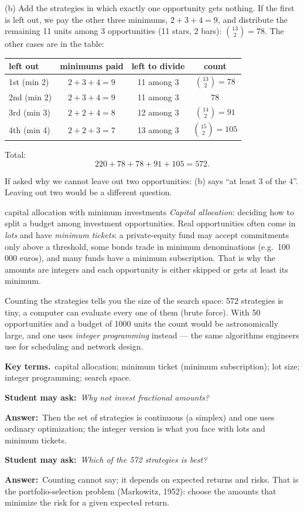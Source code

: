 \documentclass[11pt,a4paper,parskip=half]{scrartcl}
\newcommand{\terms}{\par\textbf{\color{plum}Key terms.}\ }
\newcommand{\sq}[1]{\par\textbf{\color{plum}Student may ask:}\ \emph{#1}\par}
\newcommand{\ans}{\textbf{Answer:}\ }
\begin{document}
(b) Add the strategies in which exactly one opportunity gets nothing. If the
first is left out, we pay the other three minimums, $2+3+4 = 9$, and
distribute the remaining 11 units among 3 opportunities (11 stars, 2 bars):
$\binom{13}{2} = 78$. The other cases are in the table:

\begin{center}
	\begin{tabular}{lccc}\toprule
		left out    & minimums paid & left to divide & count                 \\\midrule
		1st (min 2) & $2+3+4=9$     & 11 among 3     & $\binom{13}{2} = 78$  \\
		2nd (min 2) & $2+3+4=9$     & 11 among 3     & $78$                  \\
		3rd (min 3) & $2+2+4=8$     & 12 among 3     & $\binom{14}{2} = 91$  \\
		4th (min 4) & $2+2+3=7$     & 13 among 3     & $\binom{15}{2} = 105$ \\\bottomrule
	\end{tabular}
\end{center}

Total:
\[ 220+78+78+91+105 = 572. \]

\begin{cue}
	If asked why we cannot leave out two opportunities: (b) says ``at least
	3 of the 4''. Leaving out two would be a different question.
\end{cue}

\begin{bg}{capital allocation with minimum investments}
	\emph{Capital allocation}: deciding how to split a budget among
	investment opportunities. Real opportunities often come in \emph{lots} and
	have \emph{minimum tickets}: a private-equity fund may accept commitments
	only above a threshold, some bonds trade in minimum denominations (e.g.\
	100\,000 euros), and many funds have a minimum subscription. That is why
	the amounts are integers and each opportunity is either skipped or gets at
	least its minimum.

	Counting the strategies tells you the size of the search space: 572
	strategies is tiny, a computer can evaluate every one of them (brute
	force). With 50 opportunities and a budget of 1000 units the count would
	be astronomically large, and one uses \emph{integer programming} instead
	--- the same algorithms engineers use for scheduling and network design.

	\terms capital allocation; minimum ticket (minimum subscription); lot
	size; integer programming; search space.

	\sq{Why not invest fractional amounts?}
	\ans Then the set of strategies is continuous (a simplex) and one uses
	ordinary optimization; the integer version is what you face with lots and
	minimum tickets.

	\sq{Which of the 572 strategies is best?}
	\ans Counting cannot say; it depends on expected returns and risks. That
	is the portfolio-selection problem (Markowitz, 1952): choose the amounts
	that minimize the risk for a given expected return.
\end{bg}
\end{document}

